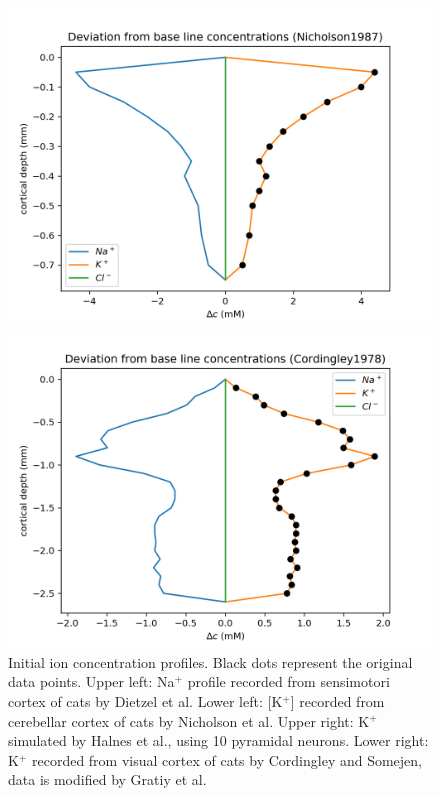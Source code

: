 \documentclass{uiophd}
\begin{document}
\begin{figure}[!tbp]
\begin{minipage}[b]{0.475\textwidth}
  \end{minipage}
  \\
  \vspace{0.05\textwidth}
  \begin{minipage}[b]{0.475\textwidth}
    \includegraphics[width=\textwidth]{Nicholson1987_delta_c.png}
  \end{minipage}
  \hfill
  \begin{minipage}[b]{0.475\textwidth}
    \includegraphics[width=\textwidth]{Cordingley1978_delta_c.png}
  \end{minipage}
  \caption{Initial ion concentration profiles. Black dots represent the original data points. Upper left: Na$^+$ profile recorded from sensimotori cortex of cats by Dietzel et al. Lower left: [K$^+$]  recorded from cerebellar cortex of cats by Nicholson et al. Upper right:  K$^+$ simulated by Halnes et al., using 10 pyramidal neurons. Lower right: K$^+$ recorded from visual cortex of cats by Cordingley and Somejen, data is modified by Gratiy et al.}
  \label{fig:initial concentrations}
\end{figure} 
\end{document}
